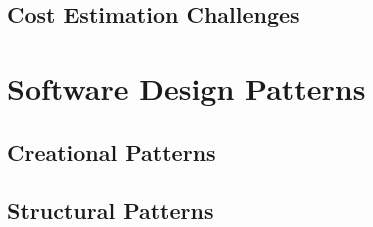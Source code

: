 \subsection{Cost Estimation Challenges}

\section{Software Design Patterns}

\subsection{Creational Patterns}
%
%

\subsection{Structural Patterns}
%

